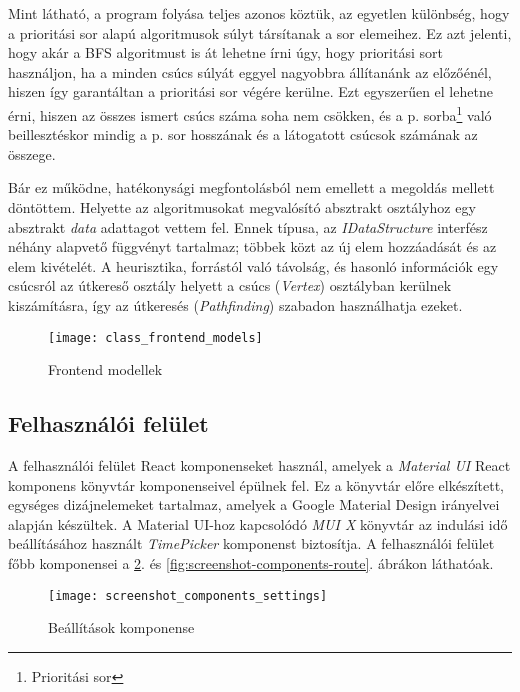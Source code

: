 Mint látható, a program folyása teljes azonos köztük, az egyetlen különbség, hogy a prioritási sor alapú algoritmusok súlyt társítanak a sor elemeihez. Ez azt jelenti, hogy akár a BFS algoritmust is át lehetne írni úgy, hogy prioritási sort használjon, ha a minden csúcs súlyát eggyel nagyobbra állítanánk az előzőénél, hiszen így garantáltan a prioritási sor végére kerülne. Ezt egyszerűen el lehetne érni, hiszen az összes ismert csúcs száma soha nem csökken, és a p. sorba\footnote{Prioritási sor} való beillesztéskor mindig a p. sor hosszának és a látogatott csúcsok számának az összege.

Bár ez működne, hatékonysági megfontolásból nem emellett a megoldás mellett döntöttem. Helyette az algoritmusokat megvalósító absztrakt osztályhoz egy absztrakt \textit{data} adattagot vettem fel. Ennek típusa, az \textit{IDataStructure} interfész néhány alapvető függvényt tartalmaz; többek közt az új elem hozzáadását és az elem kivételét. A heurisztika, forrástól való távolság, és hasonló információk egy csúcsról az útkereső osztály helyett a csúcs (\textit{Vertex}) osztályban kerülnek kiszámításra, így az útkeresés (\textit{Pathfinding}) szabadon használhatja ezeket.

\begin{figure}[H]
    \centering
    \texttt{[image: class\_frontend\_models]}
    \caption{Frontend modellek}
    \label{fig:frontend-models}
\end{figure}

\subsection{Felhasználói felület}

A felhasználói felület React komponenseket használ, amelyek a \textit{Material UI} React komponens könyvtár komponenseivel épülnek fel. Ez a könyvtár előre elkészített, egységes dizájnelemeket tartalmaz, amelyek a Google Material Design irányelvei alapján készültek\cite{mui}. A Material UI-hoz kapcsolódó \textit{MUI X} könyvtár az indulási idő beállításához használt \textit{TimePicker} komponenst biztosítja. A felhasználói felület főbb komponensei a \ref{fig:screenshot-components-settings}. és \ref{fig:screenshot-components-route}. ábrákon láthatóak.

\begin{figure}[H]
    \centering
    \texttt{[image: screenshot\_components\_settings]}
    \caption{Beállítások komponense}
    \label{fig:screenshot-components-settings}
\end{figure}

